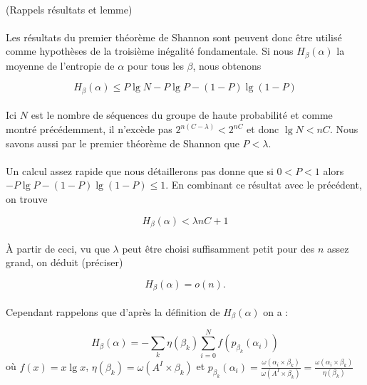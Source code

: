 	\paragraph{}
	(Rappels résultats et lemme)
	
	\paragraph{}
	Les résultats du premier théorème de Shannon sont peuvent donc être utilisé comme hypothèses de la troisième inégalité fondamentale.
	Si nous $H_\beta(\alpha)$ la moyenne de l'entropie de $\alpha$ pour tous les $\beta$, nous obtenons
	
	\[H_\beta(\alpha)\le P\lg N - P\lg P - (1-P)\lg(1-P)\]
	
	\paragraph{}
	Ici $N$ est le nombre de séquences du groupe de haute probabilité et comme montré précédemment, il n'excède pas $2^{n(C-\lambda)}<2^{nC}$
	et donc $\lg N<nC$. Nous savons aussi par le premier théorème de Shannon que $P<\lambda$.
	
	\paragraph{}
	Un calcul assez rapide que nous détaillerons pas donne que si $0<P<1$ alors $-P\lg P -(1-P)\lg(1-P)\le 1$. En combinant ce résultat avec le précédent, on trouve
	
	\[H_\beta(\alpha) < \lambda nC + 1\]
	
	\paragraph{}
	À partir de ceci, vu que $\lambda$ peut être choisi suffisamment petit pour des $n$ assez grand, on déduit (préciser)
	
	\[H_\beta(\alpha)=o(n).\]
	
	\paragraph{}
	Cependant rappelons que d'après la définition de $H_\beta(\alpha)$ on a :
	
	\[H_\beta(\alpha) = - \sum_k\eta(\beta_k)\sum_{i=0}^Nf(p_{\beta_k}(\alpha_i))\]
	où $f(x) = x \lg x$, $\eta(\beta_k) = \omega(A^I \times \beta_k)$ 
	et $p_{\beta_k}(\alpha_i) = \frac{\omega(\alpha_i \times \beta_k)}{\omega(A^I \times \beta_k)}=\frac{\omega(\alpha_i \times \beta_k)}{\eta(\beta_k)}$	
	
